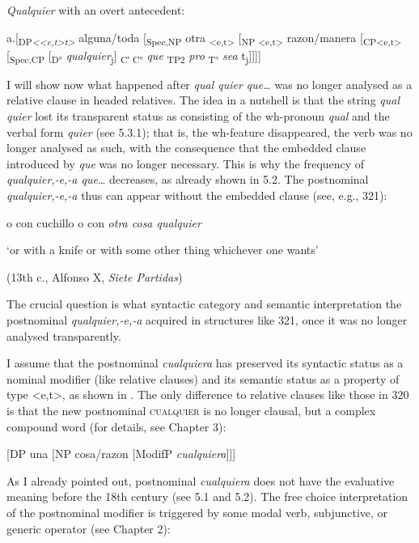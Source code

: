   \textit{Qualquier} with an overt antecedent:

  a.[\textsubscript{DP}\textit{\textsubscript{<<e,t>t>}} alguna/toda [\textsubscript{Spec,NP} otra \textsubscript{<e,t>} [\textsubscript{NP <e,t>} razon/manera [\textsubscript{CP<e,t>} [\textsubscript{Spec,CP} [\textsubscript{D°} \textit{qualquier}\textsubscript{j}] \textsubscript{C′ C°} \textit{que} \textsubscript{TP2} \textit{pro\textsubscript{} }\textsubscript{T°} \textit{sea} t\textsubscript{j}]]]]


I will show now what happened after \textit{qual quier que…} was no longer analysed as a relative clause in headed relatives. The idea in a nutshell is that the string \textit{qual quier} lost its transparent status as consisting of the wh-pronoun \textit{qual} and the verbal form \textit{quier} (see 5.3.1); that is, the wh-feature disappeared, the verb was no longer analysed as such, with the consequence that the embedded clause introduced by \textit{que} was no longer necessary. This is why the frequency of \textit{qualquier,-e,-a que}… decreases, as already shown in 5.2. The postnominal \textit{qualquier,-e,-a} thus can appear without the embedded clause (see, e.g., 321):

    o con cuchillo o con \textit{otra cosa qualquier} 

    ‘or with a knife or with some other thing whichever one wants’ 

    (13th c., Alfonso X, \textit{Siete Partidas})

The crucial question is what syntactic category and semantic interpretation the postnominal \textit{qualquier,-e,-a} acquired in structures like 321, once it was no longer analysed transparently. 

I assume that the postnominal \textit{cualquiera} has preserved its syntactic status as a nominal modifier (like relative clauses) and its semantic status as a property of type <e,t>, as shown in . The only difference to relative clauses like those in 320 is that the new postnominal \textsc{cualquier} is no longer clausal, but a complex compound word (for details, see Chapter 3):

  [DP una [NP cosa/razon [ModifP \textit{cualquiera}]]] 


As I already pointed out, postnominal \textit{cualquiera} does not have the evaluative meaning before the 18th century (see 5.1 and 5.2). The free choice interpretation of the postnominal modifier is triggered by some modal verb, subjunctive, or generic operator (see Chapter 2):

